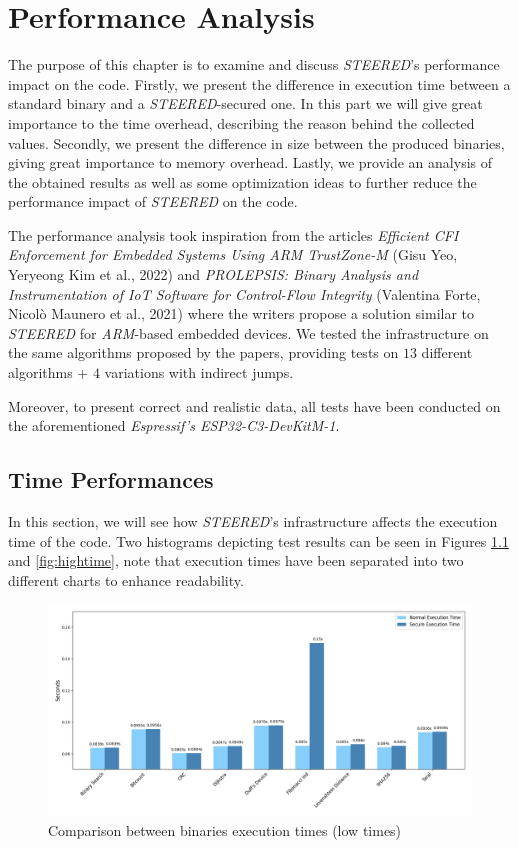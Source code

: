 \chapter{Performance Analysis}
\label{cha:pa}

The purpose of this chapter is to examine and discuss \textit{STEERED}'s performance
impact on the code. Firstly, we present the difference in execution time between
a standard binary and a \textit{STEERED}-secured one. In this part we will give great
importance to the time overhead, describing the reason behind the collected
values. Secondly, we present the difference in size between the produced
binaries, giving great importance to memory overhead. Lastly, we provide an analysis
of the obtained results as well as some optimization ideas to further reduce the
performance impact of \textit{STEERED} on the code.

The performance analysis took inspiration from the articles \textit{Efficient
CFI Enforcement for Embedded Systems Using ARM TrustZone-M}\cite{article1} (Gisu
Yeo, Yeryeong Kim et al., 2022) and \textit{PROLEPSIS: Binary Analysis and Instrumentation
of IoT Software for Control-Flow Integrity}\cite{article2} (Valentina Forte, Nicol\`{o}
Maunero et al., 2021) where the writers propose a solution similar to \textit{STEERED}
for \textit{ARM}-based embedded devices. We tested the infrastructure on the same
algorithms proposed by the papers, providing tests on $13$ different algorithms
+ $4$ variations with indirect jumps.

Moreover, to present correct and realistic data, all tests have been conducted
on the aforementioned \textit{Espressif's ESP32-C3-DevKitM-1}.

\section{Time Performances}
\label{sec:pa_time}

In this section, we will see how \textit{STEERED}'s infrastructure affects the
execution time of the code. Two histograms depicting test results can be seen in
Figures \ref{fig:lowtime} and \ref{fig:hightime}, note that execution times have
been separated into two different charts to enhance readability.

\begin{figure}[htbp]
  \centering
  \includegraphics[width=\linewidth]{images/low_times.png}
  \caption{Comparison between binaries execution times (low times)}
  \label{fig:lowtime}
\end{figure}


